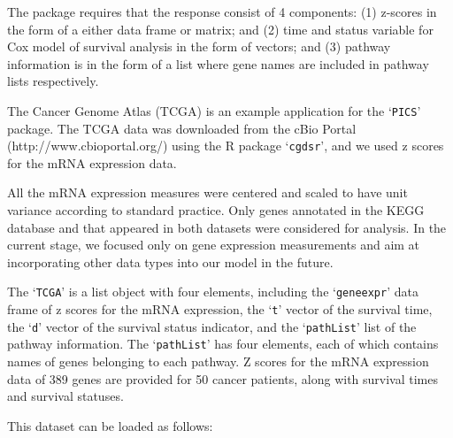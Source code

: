 \documentclass[11pt]{article}
\begin{document}
The package requires that the response consist of 4 components:
(1) z-scores in the form of a either data frame or matrix; and
(2) time and status variable for Cox model of survival analysis in the form of vectors; and
(3) pathway information is in the form of a list where gene names are included in pathway lists respectively.

The Cancer Genome Atlas (TCGA) is an example application for the `\texttt{PICS}' package.
The TCGA data was downloaded from the cBio Portal (http://www.cbioportal.org/) using the R package `\texttt{cgdsr}', and we used z scores for the mRNA expression data.

All the mRNA expression measures were centered and scaled to have unit variance according to standard practice. Only genes annotated in the KEGG database and that appeared in both datasets were considered for analysis. In the current stage, we focused only on gene expression measurements and aim at incorporating other data types into our model in the future.

The `\texttt{TCGA}' is a list object with four elements, including the `\texttt{geneexpr}' data frame of z scores for the mRNA expression, the `\texttt{t}' vector of the survival time, the `\texttt{d}' vector of the survival status indicator, and the `\texttt{pathList}' list of the pathway information. The `\texttt{pathList}' has four elements, each of which contains names of genes belonging to each pathway. Z scores for the mRNA expression data of 389 genes are provided for 50 cancer patients, along with survival times and survival statuses.

This dataset can be loaded as follows:
\end{document}
